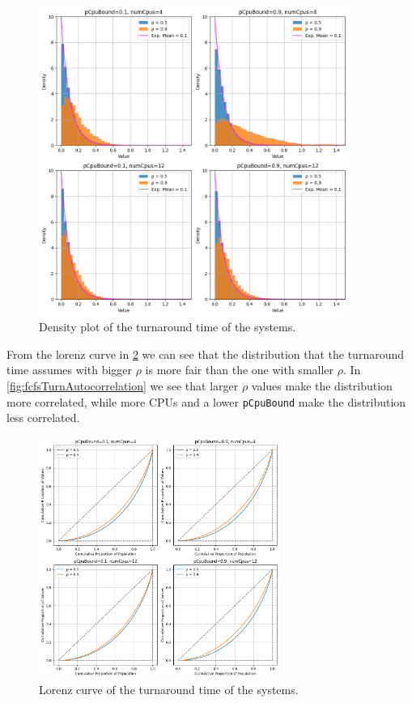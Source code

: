 \begin{figure}[H]
    \captionsetup{type=figure}
    \centering
    \includegraphics[width=0.9\textwidth]{./images/04/fcfs/turn/density.png}
    \caption{Density plot of the turnaround time of the systems.}
    \label{fig:fcfsTurnDensity}
\end{figure}

From the lorenz curve in \cref{fig:fcfsTurnLorenz} we can see that the distribution that the turnaround time assumes with bigger $\rho$ is more fair than the one with smaller $\rho$. In \cref{fig:fcfsTurnAutocorrelation} we see that larger $\rho$ values make the distribution more correlated, while more CPUs and a lower \texttt{pCpuBound} make the distribution less correlated.

\begin{figure}[H]
    \captionsetup{type=figure}
    \centering
    \includegraphics[width=0.7\textwidth]{./images/04/fcfs/turn/lorenz.png}
    \caption{Lorenz curve of the turnaround time of the systems.}
    \label{fig:fcfsTurnLorenz}
\end{figure}

